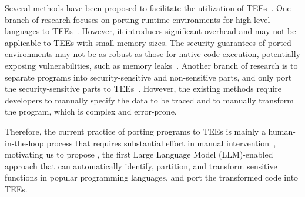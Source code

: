 Several methods have been proposed to facilitate the utilization of TEEs~\cite{wuLCZWYLS24tc,miao23icse,zhang2024no,lind2017glamdring}.
One branch of research focuses on porting runtime environments for high-level languages to TEEs~\cite{wuLCZWYLS24tc,miao23icse}.
However, it introduces significant overhead and may not be applicable to TEEs with small memory sizes.
The security guarantees of ported environments may not be as robust as those for native code execution, potentially exposing vulnerabilities, such as memory leaks~\cite{sekeQianWZ18, kbseShahoorKYK23}.
Another branch of research is to separate programs into security-sensitive and non-sensitive parts, and only port the security-sensitive parts to TEEs~\cite{zhang2024no,lind2017glamdring}.
However, the existing methods require developers to manually specify the data to be traced and to manually transform the program, which is complex and error-prone.

Therefore, the current practice of porting programs to TEEs is mainly a human-in-the-loop process that requires substantial effort in manual intervention~\cite{seo2017sgx, ShankerJG20sigsoft, 9276587}, motivating us to propose \system, the first Large Language Model (LLM)-enabled approach that can automatically identify, partition, and transform sensitive functions in popular programming languages, and port the transformed code into TEEs.


